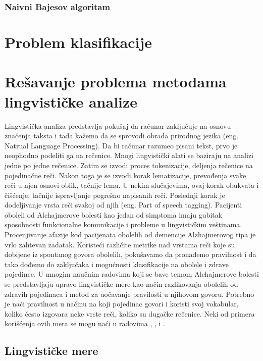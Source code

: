\documentclass[12pt,oneside]{memoir}
\begin{document}
\subsection{Naivni Bajesov algoritam}

\chapter{Problem klasifikacije}

\chapter{Rešavanje problema metodama lingvističke analize}

Lingvistička analiza predstavlja pokušaj da računar zaključuje na osnovu značenja taksta i tada kažemo da se sprovodi obrada prirodnog jezika (eng. Natrual Language Processing).  Da bi računar razumeo pisani tekst,  prvo je neophodno podeliti ga na rečenice.  Mnogi lingvistički alati se baziraju na analizi jedne po jedne rečenice.  Zatim se izvodi proces tokenizacije,  deljenja rečenice na pojedinačne reči.  Nakon toga je se izvodi korak lematizacije,  prevođenja svake reči u njen osnovi oblik, tačnije lemu.  U nekim slučajevima,  ovaj korak obukvata i čišćenje, tačnije ispravljanje pogrešno napisanih reči.  Poslednji korak je dodeljivanje vrsta reči svakoj od njih (eng. Part of speech tagging). 
Pacijenti oboleli od Alchajmerove bolesti kao jedan od simptoma imaju gubitak sposobnosti funkcionalne komunikacije i probleme u lingvističkim veštinama.  Procenjivanje afazije kod pacijenata obolelih od demencije Alzhajmerovog tipa je vrlo zahtevan zadatak.  Koristeći različite metrike nad vrstama reči koje su dobijene iz spontanog govora obolelih,  pokušavamo da pronađemo pravilnost i da tako dođemo do zaključaka i mogućnosti klasifikacije na obolele i zdrave pojedince.  
U mnogim naučnim radovima koji se bave temom Alchajmerove bolesti se predstavljaju upravo lingvističke mere kao način razlikovanja obolelih od zdravih pojedinaca i metod za uočavanje pravilosti u njihovom govoru. Potrebno je naći pravilnost u načinu na koji pojedinac govori i koristi svoj vokabular, koliko često izgovara neke vrste reči,  koliko su dugačke rečenice.  Neki od primera korišćenja ovih mera se mogu naći u radovima , \cite{automaticdetandrat}, \cite{Evaloftechfolexicalperformance} i \cite{linguisticfeatures}.

\section{Lingvističke mere}
\end{document}
